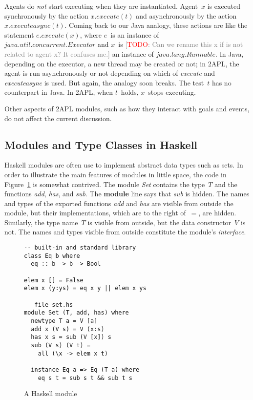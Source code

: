 \documentclass[conference,compsoc]{IEEEtran}
\newcommand{\todo}[1]{{\small \textcolor{gray}{[\textcolor{red}{TODO}: #1]}}}
\begin{document}
Agents do \emph{not} start executing when they are instantiated. Agent~$x$
is executed synchronously by the action $x.\mathit{execute}(t)$ and
asynchronously by the action $x.\mathit{executeasync}(t)$. Coming back to
our Java analogy, these actions are like the statement
$e.\mathit{execute}(x)$, where $e$~is an instance of
$\mathit{java}.\mathit{util}.\mathit{concurrent}.\mathit{Executor}$ and
$x$~is \todo{Can we rename this x if is not related to agent x? It confuses
me.} an instance of $\mathit{java}.\mathit{lang}.\mathit{Runnable}$.  In
Java, depending on the executor, a new thread may be created or not; in
2APL, the agent is run asynchronously or not depending on which of
\textit{execute} and \textit{executeasync} is used. But again, the analogy
soon breaks. The test~$t$ has no counterpart in Java. In 2APL, when
$t$~holds, $x$~stops executing.

Other aspects of 2APL modules, such as how they interact with goals and
events, do not affect the current discussion.

\subsection{Modules and Type Classes in Haskell}


Haskell modules are often use to implement abstract data types such as
sets.  In order to illustrate the main features of modules in little space,
the code in Figure~\ref{fig:haskell} is somewhat contrived.  The module
\textit{Set} contains the type~$T$ and the functions \textit{add},
\textit{has}, and \textit{sub}. The \textbf{module} line says that
\textit{sub} is hidden. The names and types of the exported functions
\textit{add} and \textit{has} are visible from outside the module, but
their implementations, which are to the right of~$=$, are hidden.
Similarly, the type name~$T$ is visible from outside, but the data
constructor~$V$ is not.  The names and types visible from outside
constitute the module's \emph{interface}.

\begin{figure}\centering\small
\begin{verbatim}
-- built-in and standard library
class Eq b where
  eq :: b -> b -> Bool

elem x [] = False
elem x (y:ys) = eq x y || elem x ys

-- file set.hs
module Set (T, add, has) where
  newtype T a = V [a]
  add x (V s) = V (x:s)
  has x s = sub (V [x]) s
  sub (V s) (V t) =
    all (\x -> elem x t)

  instance Eq a => Eq (T a) where
    eq s t = sub s t && sub t s
\end{verbatim}
\caption{A Haskell module}\label{fig:haskell}
\end{figure}
\end{document}
